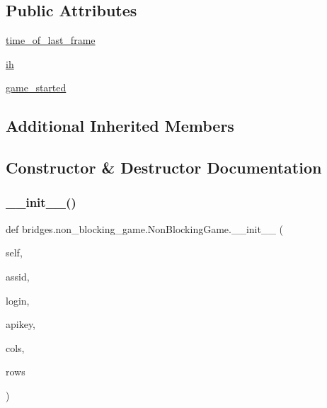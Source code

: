 \subsection*{Public Attributes}
\begin{DoxyCompactItemize}
\item 
\hyperlink{classbridges_1_1non__blocking__game_1_1_non_blocking_game_a828f1abe5336e15ffc718411378da266}{time\+\_\+of\+\_\+last\+\_\+frame}
\item 
\hyperlink{classbridges_1_1non__blocking__game_1_1_non_blocking_game_a5fd9d6e53b58f6237372dfaad03db961}{ih}
\item 
\hyperlink{classbridges_1_1non__blocking__game_1_1_non_blocking_game_a9fdc4b04a7898b739ed05554d64560c7}{game\+\_\+started}
\end{DoxyCompactItemize}
\subsection*{Additional Inherited Members}


\subsection{Constructor \& Destructor Documentation}
\mbox{\label{classbridges_1_1non__blocking__game_1_1_non_blocking_game_a19362773d256eec033f04cfd00b7160c}} 
\subsubsection{\texorpdfstring{\+\_\+\+\_\+init\+\_\+\+\_\+()}{\_\_init\_\_()}}
{\footnotesize\ttfamily def bridges.\+non\+\_\+blocking\+\_\+game.\+Non\+Blocking\+Game.\+\_\+\+\_\+init\+\_\+\+\_\+ (\begin{DoxyParamCaption}\item[{}]{self,  }\item[{}]{assid,  }\item[{}]{login,  }\item[{}]{apikey,  }\item[{}]{cols,  }\item[{}]{rows }\end{DoxyParamCaption})}



